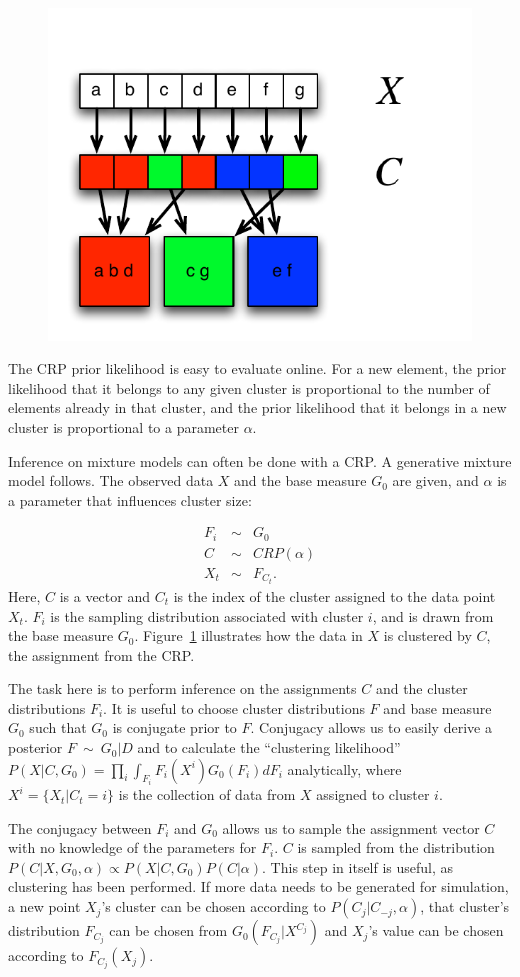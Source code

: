\begin{figure}[t]
\begin{center}
\includegraphics[width=0.4\linewidth]{figures/crp-mixture.pdf}
\caption{}
\label{intro:crp-mixture}
\end{center}
\end{figure}


The CRP prior likelihood is easy to evaluate online. For a new element, the prior likelihood that it belongs to any given cluster is proportional to the number of elements already in that cluster, and the prior likelihood that it belongs in a new cluster is proportional to a parameter $\alpha$.

Inference on mixture models can often be done with a CRP. A generative mixture model follows. The observed data $X$ and the base measure $G_0$ are given, and $\alpha$ is a parameter that influences cluster size:

\begin{eqnarray}
F_i&\sim&G_0\\
C&\sim&CRP(\alpha)\\
X_t&\sim&F_{C_t}.
\end{eqnarray}
Here, $C$ is a vector and $C_t$ is the index of the cluster assigned to the data point $X_t$. $F_i$ is the sampling distribution associated with cluster $i$, and is drawn from the base measure $G_0$. Figure~\ref{intro:crp-mixture} illustrates how the data in $X$ is clustered by $C$, the assignment from the CRP.

The task here is to perform inference on the assignments $C$ and the cluster distributions $F_i$. It is useful to choose cluster distributions $F$ and base measure $G_0$ such that $G_0$ is conjugate prior to $F$. Conjugacy allows us to easily derive a posterior $F~\sim~G_0|D$ and to calculate the ``clustering likelihood'' $P(X|C,G_0)=\prod_i\int_{F_i} F_i(X^i)G_0(F_i)dF_i$ analytically, where $X^i=\{X_t|C_t=i\}$ is the collection of data from $X$ assigned to cluster $i$. 

The conjugacy between $F_i$ and $G_0$ allows us to sample the assignment vector $C$ with no knowledge of the parameters for $F_i$. $C$ is sampled from the distribution $P(C|X,G_0,\alpha)\propto P(X|C,G_0)P(C|\alpha)$. This step in itself is useful, as clustering has been performed. If more data needs to be generated for simulation, a new point $X_j$'s cluster can be chosen according to $P(C_j|C_{-j},\alpha)$, that cluster's distribution $F_{C_j}$ can be chosen from $G_0(F_{C_j}|X^{C_j})$ and $X_j$'s value can be chosen according to $F_{C_j}(X_j)$.

